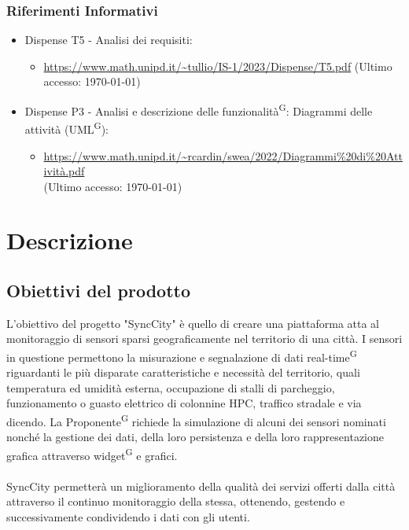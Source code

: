 \documentclass[8pt]{article}
\newcommand{\glossterm}[1]{#1\textsuperscript{G}} %
\begin{document}
\subsubsection{Riferimenti Informativi}
\begin{itemize}
	\setlength\itemsep{0em}
	\item Dispense T5 - Analisi dei requisiti:
    \begin{itemize}
        \item \href{https://www.math.unipd.it/~tullio/IS-1/2023/Dispense/T5.pdf}{https://www.math.unipd.it/\textasciitilde{}tullio/IS-1/2023/Dispense/T5.pdf} (Ultimo accesso: \today)
    \end{itemize}
    \item Dispense P3 - Analisi e descrizione delle \glossterm{funzionalità}: Diagrammi delle attività (\glossterm{UML}):
        \begin{itemize}
            \item
                \href{https://www.math.unipd.it/~rcardin/swea/2022/Diagrammi\%20di\%20Attivit\%C3\%A0.pdf}{https://www.math.unipd.it/\textasciitilde{}rcardin/swea/2022/Diagrammi\%20di\%20Attivit\`{a}.pdf}
                \\ (Ultimo accesso: \today)
        \end{itemize}
\end{itemize}
\newpage
\section{Descrizione}
\subsection{Obiettivi del prodotto}
L'obiettivo del progetto "SyncCity" è quello di creare una piattaforma atta al monitoraggio di sensori
sparsi geograficamente nel territorio di una città. I sensori in questione permettono la misurazione
e segnalazione di dati \glossterm{real-time} riguardanti le più disparate caratteristiche e necessità del
territorio, quali temperatura ed umidità esterna, occupazione di stalli di parcheggio, funzionamento
o guasto elettrico di colonnine HPC, traffico stradale e via dicendo. La \glossterm{Proponente} richiede la
simulazione di alcuni dei sensori nominati nonché la gestione dei dati, della loro persistenza e
della loro rappresentazione grafica attraverso \glossterm{widget} e grafici. \\\\SyncCity permetterà un miglioramento della qualità dei servizi offerti dalla città attraverso il continuo monitoraggio della stessa, ottenendo, gestendo e successivamente condividendo i dati con gli utenti. 
\end{document}
